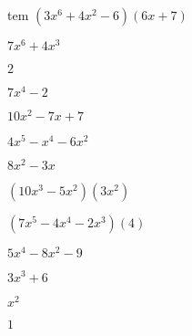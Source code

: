 \documentclass{article}
\begin{document}
\begin{multicols}{2}
tem $(3x^{6}+4x^2-6)(6x+7)$\item $7x^{6}+4x^{3}$\item $2$\item $7x^{4}-2$\item $10x^2-7x+7$\item $4x^{5}-x^{4}-6x^2$\item $8x^2-3x$\item $(10x^{3}-5x^2)(3x^2)$\item $(7x^{5}-4x^{4}-2x^{3})(4)$\item $5x^{4}-8x^2-9$\item $3x^{3}+6$\item $x^2$\item $1$\item 
\end{multicols}
\end{document}
